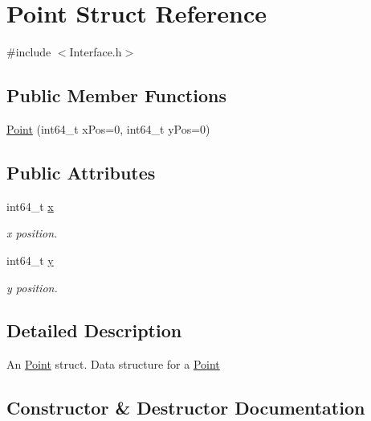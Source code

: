 \hypertarget{struct_point}{}\section{Point Struct Reference}
\label{struct_point}


{\ttfamily \#include $<$Interface.\+h$>$}

\subsection*{Public Member Functions}
\begin{DoxyCompactItemize}
\item 
\hyperlink{struct_point_aa47ffad652977b5dd3397a0c499a0115}{Point} (int64\+\_\+t x\+Pos=0, int64\+\_\+t y\+Pos=0)
\end{DoxyCompactItemize}
\subsection*{Public Attributes}
\begin{DoxyCompactItemize}
\item 
\hypertarget{struct_point_a8e2cc6a0add9b96e3bfb3c9fc1d66671}{}int64\+\_\+t \hyperlink{struct_point_a8e2cc6a0add9b96e3bfb3c9fc1d66671}{x}\label{struct_point_a8e2cc6a0add9b96e3bfb3c9fc1d66671}

\begin{DoxyCompactList}\small\item\em x position. \end{DoxyCompactList}\item 
\hypertarget{struct_point_ac9a5b1fd0b1de4e720aa7c14c2259801}{}int64\+\_\+t \hyperlink{struct_point_ac9a5b1fd0b1de4e720aa7c14c2259801}{y}\label{struct_point_ac9a5b1fd0b1de4e720aa7c14c2259801}

\begin{DoxyCompactList}\small\item\em y position. \end{DoxyCompactList}\end{DoxyCompactItemize}


\subsection{Detailed Description}
An \hyperlink{struct_point}{Point} struct. Data structure for a \hyperlink{struct_point}{Point} 

\subsection{Constructor \& Destructor Documentation}
\hypertarget{struct_point_aa47ffad652977b5dd3397a0c499a0115}{}
